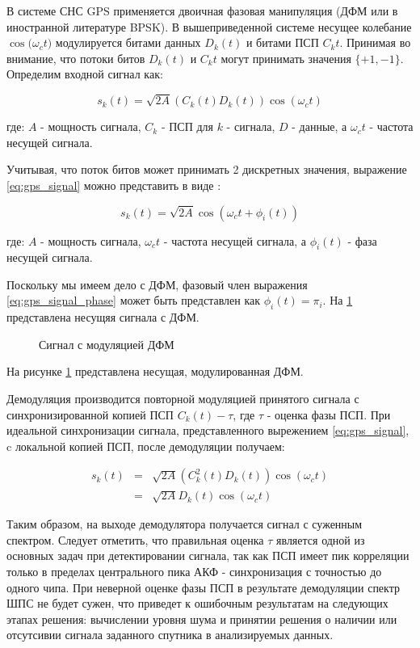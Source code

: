 В системе СНС GPS применяется двоичная фазовая манипуляция (ДФМ или в иностранной литературе BPSK).
В вышеприведенной системе несущее колебание ${\cos(\omega_{c}t})$ модулируется битами данных ${D_k(t)}$ и битами ПСП
${C_k{t}}$. Принимая во внимание, что потоки битов ${D_k(t)}$ и ${C_k{t}}$ могут принимать значения
${\{+1, -1\}}$. Определим входной сигнал как:

\begin{center}
\begin{equation}
	\label{eq:gps_signal}
	s_k(t) = \sqrt{2A}(C_k(t)D_k(t))\cos(\omega_{c}t)
\end{equation}
\end{center}
где: ${A}$ - мощность сигнала, ${C_k}$ - ПСП для ${k}$ - сигнала, ${D}$ - данные, а ${\omega_{c}t}$ - частота несущей сигнала.

Учитывая, что поток битов может принимать 2 дискретных значения, выражение \ref{eq:gps_signal} можно представить в виде \cite{sklyar}:
\begin{center}
\begin{equation}
	\label{eq:gps_signal_phase}
	s_k(t) = \sqrt{2A}\cos(\omega_{c}t + \phi_{i}(t))
\end{equation}
\end{center}
где: ${A}$ - мощность сигнала, ${\omega_{c}t}$ - частота несущей сигнала, а ${\phi_{i}(t)}$ - фаза несущей сигнала.

Поскольку мы имеем дело с ДФМ, фазовый член выражения \ref{eq:gps_signal_phase} может быть представлен как
${\phi_{i}(t) = \pi_{i}}$. На \ref{pic:sec1_bpsk} представлена несущяя сигнала с ДФМ.

\begin{figure}[ht]
\center{}
\caption{Сигнал с модуляцией ДФМ}
\label{pic:sec1_bpsk}
\end{figure}
На рисунке \ref{pic:sec1_bpsk} представлена несущая, модулированная ДФМ.

Демодуляция производится повторной модуляцией принятого сигнала с синхронизированной копией ПСП ${C_k(t) - \tau}$, где
${\tau}$ - оценка фазы ПСП. При идеальной синхронизации сигнала, представленного вырежением \ref{eq:gps_signal},
c локальной копией ПСП, после демодуляции получаем:
\begin{center}
\begin{eqnarray}
	\label{eq:gps_signal_modulated}
	s_k(t) & = & \sqrt{2A}(C^2_k(t)D_k(t))\cos(\omega_{c}t) \\
	& = &\sqrt{2A}D_k(t)\cos(\omega_{c}t)
\end{eqnarray}
\end{center}
Таким образом, на выходе демодулятора получается сигнал с суженным спектром. Следует отметить, что правильная оценка ${\tau}$
является одной из основных задач при детектировании сигнала, так как ПСП имеет пик корреляции только в пределах центрального пика
АКФ \cite{gold-ieee}  - синхронизация с точностью до одного чипа. При неверной оценке фазы ПСП в результате демодуляции спектр
ШПС не будет сужен, что приведет к ошибочным результатам на следующих этапах решения: вычислении уровня шума и принятии решения
о наличии или отсутсивии сигнала заданного спутника в анализируемых данных.

